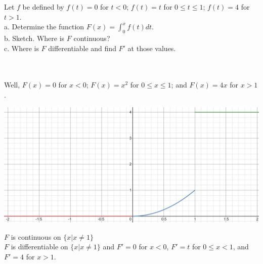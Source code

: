 Let $f$ be defined by $f(t)=0$ for $t<0$; $f(t)=t$ for $0\leq t\leq1$; $f(t)=4$ for $t>1$.\\

a. Determine the function $F(x)=\int_0^xf(t)dt$.\\

b. Sketch. Where is $F$ continuous?\\

c. Where is $F$ differentiable and find $F'$ at those values.\\\\

\begin{solution}\renewcommand{\qedsymbol}{}\ \\
    Well, $F(x)=0$ for $x<0$; $F(x)=x^2$ for $0\leq x\leq1$; and $F(x)=4x$ for $x>1$.\\

    \begin{center}
        \includegraphics[scale=0.5]{graph F.JPG}\\
    \end{center}

    $F$ is continuous on $\{x|x\neq1\}$\\

    $F$ is differentiable on $\{x|x\neq1\}$ and $F'=0$ for $x<0$, $F'=t$ for $0\leq x<1$, and $F'=4$ for
    $x>1$.

\end{solution}